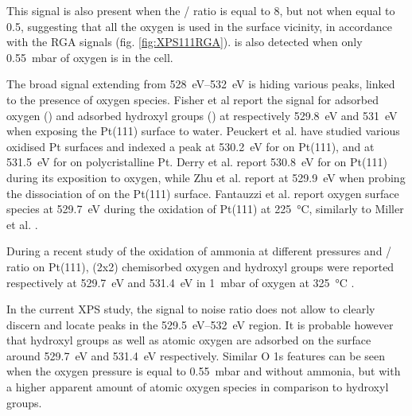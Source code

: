 This signal is also present when the / ratio is equal to 8, but not when equal to 0.5, suggesting that all the oxygen is used in the surface vicinity, in accordance with the RGA signals (fig. \ref{fig:XPS111RGA}).
 is also detected when only \qty{0.55}{\milli\bar} of oxygen is in the cell.

The broad signal extending from \qtyrange{528}{532}{\eV} is hiding various peaks, linked to the presence of oxygen species.
Fisher et al \parencite*{Fisher1980} report the signal for adsorbed oxygen () and adsorbed hydroxyl groups () at respectively \qty{529.8}{\eV} and \qty{531}{\eV} when exposing the Pt(111) surface to water.
Peuckert et al. \parencite*{Peuckert1984} have studied various oxidised Pt surfaces and indexed a peak at \qty{530.2}{\eV} for  on Pt(111), and at \qty{531.5}{\eV} for  on polycristalline Pt.
Derry et al. \parencite*{Derry1984} report \qty{530.8}{\eV} for  on Pt(111) during its exposition to oxygen, while Zhu et al. \parencite*{Zhu2003} report  at \qty{529.9}{\eV} when probing the dissociation of  on the Pt(111) surface.
Fantauzzi et al. \parencite*{Fantauzzi2017} report oxygen surface species at \qty{529.7}{\eV} during the oxidation of Pt(111) at \qty{225}{\degreeCelsius}, similarly to Miller et al. \parencite*{Miller2014}.

During a recent study of the oxidation of ammonia at different pressures and / ratio on Pt(111), (2x2) chemisorbed oxygen and hydroxyl groups were reported respectively at \qty{529.7}{\eV} and \qty{531.4}{\eV} in \qty{1}{\milli\bar} of oxygen at \qty{325}{\degreeCelsius} \parencite{Ivashenko2021}.

In the current XPS study, the signal to noise ratio does not allow to clearly discern and locate peaks in the \qtyrange{529.5}{532}{\eV} region.
It is probable however that hydroxyl groups as well as atomic oxygen are adsorbed on the surface around \qty{529.7}{\eV} and \qty{531.4}{\eV} respectively.
Similar O 1s features can be seen when the oxygen pressure is equal to \qty{0.55}{\milli\bar} and without ammonia, but with a higher apparent amount of atomic oxygen species in comparison to hydroxyl groups.

